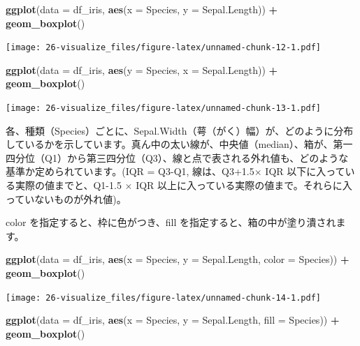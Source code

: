 \documentclass[
  xelatex, ja=standard]{bxjsbook}
\newenvironment{Shaded}{\begin{snugshade}}{\end{snugshade}}
\newcommand{\AttributeTok}[1]{\textcolor[rgb]{0.13,0.29,0.53}{#1}}
\newcommand{\FunctionTok}[1]{\textcolor[rgb]{0.13,0.29,0.53}{\textbf{#1}}}
\newcommand{\NormalTok}[1]{#1}
\newcommand{\SpecialCharTok}[1]{\textcolor[rgb]{0.81,0.36,0.00}{\textbf{#1}}}
\theoremstyle{definition}
\theoremstyle{definition}
\theoremstyle{definition}
\theoremstyle{definition}
\theoremstyle{remark}
\begin{document}
\begin{Shaded}
\begin{Highlighting}[]
\FunctionTok{ggplot}\NormalTok{(}\AttributeTok{data =}\NormalTok{ df\_iris, }\FunctionTok{aes}\NormalTok{(}\AttributeTok{x =}\NormalTok{ Species, }\AttributeTok{y =}\NormalTok{ Sepal.Length)) }\SpecialCharTok{+}
  \FunctionTok{geom\_boxplot}\NormalTok{()}
\end{Highlighting}
\end{Shaded}

\texttt{[image: 26-visualize\_files/figure-latex/unnamed-chunk-12-1.pdf]}

\begin{Shaded}
\begin{Highlighting}[]
\FunctionTok{ggplot}\NormalTok{(}\AttributeTok{data =}\NormalTok{ df\_iris, }\FunctionTok{aes}\NormalTok{(}\AttributeTok{y =}\NormalTok{ Species, }\AttributeTok{x =}\NormalTok{ Sepal.Length)) }\SpecialCharTok{+}
  \FunctionTok{geom\_boxplot}\NormalTok{()}
\end{Highlighting}
\end{Shaded}

\texttt{[image: 26-visualize\_files/figure-latex/unnamed-chunk-13-1.pdf]}

各、種類（Species）ごとに、Sepal.Width（萼（がく）幅）が、どのように分布しているかを示しています。真ん中の太い線が、中央値（median）、箱が、第一四分位（Q1）から第三四分位（Q3）、線と点で表される外れ値も、どのような基準か定められています。(IQR = Q3-Q1, 線は、Q3+1.5\(\times\) IQR 以下に入っている実際の値までと、Q1-1.5 \(\times\) IQR 以上に入っている実際の値まで。それらに入っていないものが外れ値)。

color を指定すると、枠に色がつき、fill を指定すると、箱の中が塗り潰されます。

\begin{Shaded}
\begin{Highlighting}[]
\FunctionTok{ggplot}\NormalTok{(}\AttributeTok{data =}\NormalTok{ df\_iris, }\FunctionTok{aes}\NormalTok{(}\AttributeTok{x =}\NormalTok{ Species, }\AttributeTok{y =}\NormalTok{ Sepal.Length, }\AttributeTok{color =}\NormalTok{ Species)) }\SpecialCharTok{+}
  \FunctionTok{geom\_boxplot}\NormalTok{()}
\end{Highlighting}
\end{Shaded}

\texttt{[image: 26-visualize\_files/figure-latex/unnamed-chunk-14-1.pdf]}

\begin{Shaded}
\begin{Highlighting}[]
\FunctionTok{ggplot}\NormalTok{(}\AttributeTok{data =}\NormalTok{ df\_iris, }\FunctionTok{aes}\NormalTok{(}\AttributeTok{x =}\NormalTok{ Species, }\AttributeTok{y =}\NormalTok{ Sepal.Length, }\AttributeTok{fill =}\NormalTok{ Species)) }\SpecialCharTok{+}
  \FunctionTok{geom\_boxplot}\NormalTok{()}
\end{Highlighting}
\end{Shaded}
\end{document}
